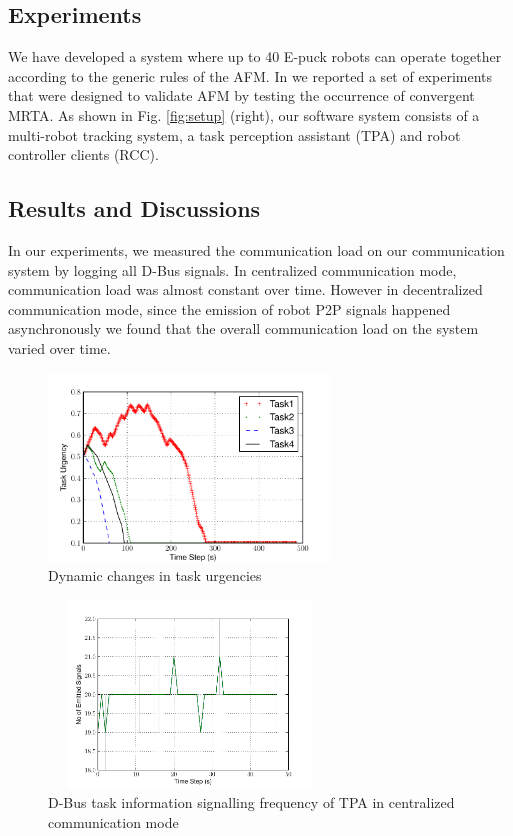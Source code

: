 \documentclass{ifacconf}
\begin{document}
\subsection{Experiments}
We have developed a system where up to 40 E-puck robots \cite{Epuck} can operate together according to the generic rules of the AFM. In \cite{Sarker+2010ants}we reported a set of experiments that were designed to validate AFM by testing the occurrence of convergent MRTA.  As shown in Fig. \ref{fig:setup} (right), our software system consists of a multi-robot tracking system, a task perception assistant (TPA) and robot controller clients (RCC). 
\subsection{Results and Discussions}
In our experiments, we measured the communication load on our communication system by logging all D-Bus signals. In  centralized communication mode, communication load was almost constant over time.  However in decentralized communication mode, since the emission of robot P2P signals happened asynchronously we found that the overall communication load on the system varied over time. 
\begin{figure}
\begin{center}
\includegraphics[width=7.5cm,height=5cm]{./images/PlotUrgencyLog-2010Feb15-171017}    %
\caption{Dynamic changes in task urgencies} 
\label{fig:task-urgency}
\end{center}
\end{figure}
\begin{figure}
\begin{center}
\includegraphics[width=7.5cm,height=5cm]{./images/Global-SignalingFreqStat}    %
\caption{D-Bus task information signalling frequency of TPA in centralized communication mode} 
\label{fig:global-freq}
\end{center}
\end{figure}
\end{document}
